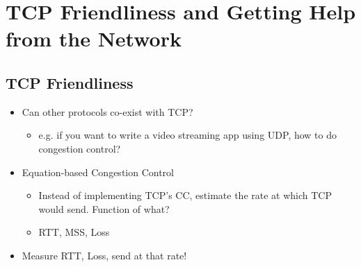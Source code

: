 \chapter{TCP Friendliness and Getting Help from the Network}
\section{TCP Friendliness}
\begin{itemize}[nosep]
    \item Can other protocols co-exist with TCP?
          \begin{itemize}[nosep]
              \item e.g. if you want to write a video streaming app using UDP, how to do congestion control?
          \end{itemize}
    \item Equation-based Congestion Control
          \begin{itemize}[nosep]
              \item Instead of implementing TCP's CC, estimate the rate at which TCP would send. Function of what?
              \item RTT, MSS, Loss
          \end{itemize}
    \item Measure RTT, Loss, send at that rate!
\end{itemize}
